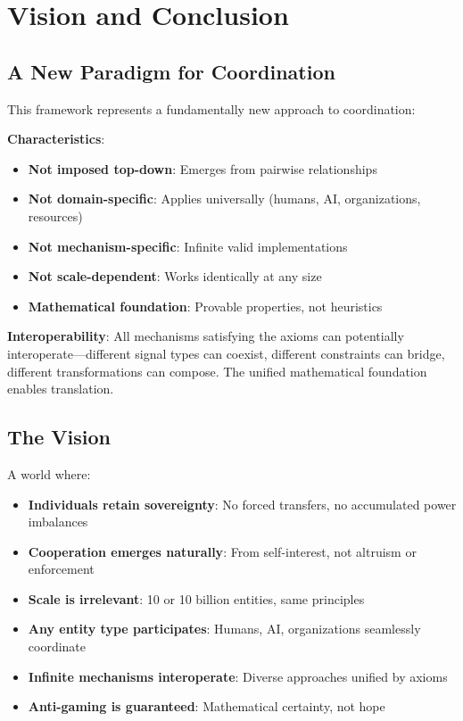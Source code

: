 \documentclass[11pt,a4paper]{article}
\theoremstyle{definition}
\theoremstyle{remark}
\begin{document}
\section{Vision and Conclusion}

\subsection{A New Paradigm for Coordination}

This framework represents a fundamentally new approach to coordination:

\textbf{Characteristics}:
\begin{itemize}
\item \textbf{Not imposed top-down}: Emerges from pairwise relationships
\item \textbf{Not domain-specific}: Applies universally (humans, AI, organizations, resources)
\item \textbf{Not mechanism-specific}: Infinite valid implementations
\item \textbf{Not scale-dependent}: Works identically at any size
\item \textbf{Mathematical foundation}: Provable properties, not heuristics
\end{itemize}

\textbf{Interoperability}: All mechanisms satisfying the axioms can potentially interoperate—different signal types can coexist, different constraints can bridge, different transformations can compose. The unified mathematical foundation enables translation.

\subsection{The Vision}

A world where:
\begin{itemize}
\item \textbf{Individuals retain sovereignty}: No forced transfers, no accumulated power imbalances
\item \textbf{Cooperation emerges naturally}: From self-interest, not altruism or enforcement
\item \textbf{Scale is irrelevant}: 10 or 10 billion entities, same principles
\item \textbf{Any entity type participates}: Humans, AI, organizations seamlessly coordinate
\item \textbf{Infinite mechanisms interoperate}: Diverse approaches unified by axioms
\item \textbf{Anti-gaming is guaranteed}: Mathematical certainty, not hope
\end{itemize}
\end{document}

